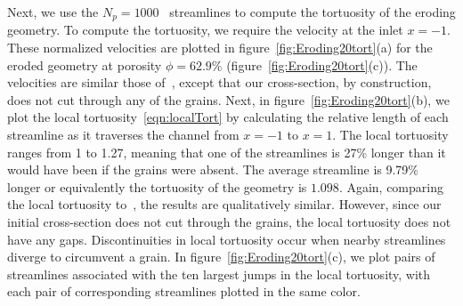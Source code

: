 \documentclass{jfm}
\begin{document}
Next, we use the $N_p = 1000$~\citep{bel-sal-rin1992} streamlines to
compute the tortuosity of the eroding geometry.  To compute the
tortuosity, we require the velocity at the inlet $x=-1$.  These
normalized velocities are plotted in figure~\ref{fig:Eroding20tort}(a)
for the eroded geometry at porosity $\phi = 62.9\%$
(figure~\ref{fig:Eroding20tort}(c)).  The velocities are similar those
of~\citet[see figure 4(a)]{mat-kha-koz2008}, except that our
cross-section, by construction, does not cut through any of the grains.
Next, in figure~\ref{fig:Eroding20tort}(b), we plot the local
tortuosity~\eqref{eqn:localTort} by calculating the relative length of
each streamline as it traverses the channel from $x=-1$ to $x=1$.  The
local tortuosity ranges from 1 to 1.27, meaning that one of the
streamlines is 27\% longer than it would have been if the grains were
absent.  The average streamline is 9.79\% longer or equivalently the
tortuosity of the geometry is $1.098$.  Again, comparing the local
tortuosity to~\citet[see figure 4(b)]{mat-kha-koz2008}, the results are
qualitatively similar. However, since our initial cross-section does not
cut through the grains, the local tortuosity does not have any gaps.
Discontinuities in local tortuosity occur when nearby streamlines
diverge to circumvent a grain.  In figure~\ref{fig:Eroding20tort}(c), we
plot pairs of streamlines associated with the ten largest jumps in the
local tortuosity, with each pair of corresponding streamlines plotted in
the same color.
\end{document}
